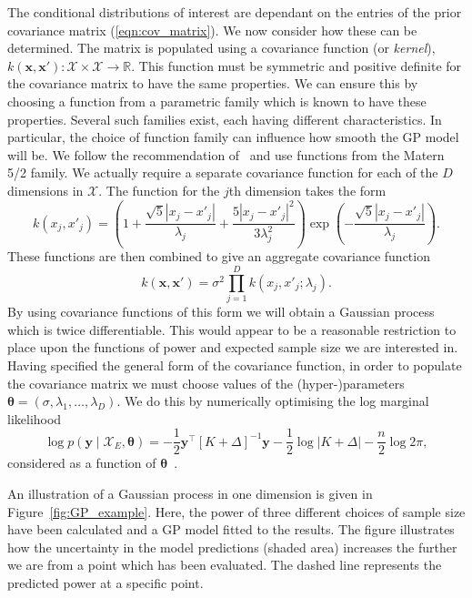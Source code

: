 \documentclass{article} %
\begin{document}
The conditional distributions of interest are dependant on the entries of the prior covariance matrix (\ref{eqn:cov_matrix}). We now consider how these can be determined. The matrix is populated using a covariance function (or \emph{kernel}), $k(\mathbf{x}, \mathbf{x}') : \mathcal{X} \times \mathcal{X} \rightarrow \mathbb{R}$. This function must be symmetric and positive definite for the covariance matrix to have the same properties. We can ensure this by choosing a function from a parametric family which is known to have these properties. Several such families exist, each having different characteristics. In particular, the choice of function family can influence how smooth the GP model will be. We follow the  recommendation of~\cite{Roustant2012} and use functions from the Matern 5/2 family. We actually require a separate covariance function for each of the $D$ dimensions in $\mathcal{X}$. The function for the $j$th dimension takes the form
\begin{equation}
k(x_{j}, x'_{j}) = \left( 1 + \frac{\sqrt{5}|x_{j}-x'_{j}|}{\lambda_{j}} + \frac{5|x_{j}-x'_{j}|^{2}}{3\lambda_{j}^{2}} \right) \exp \left( - \frac{\sqrt{5}|x_{j}-x'_{j}|}{\lambda_{j}} \right).
\end{equation}
These functions are then combined to give an aggregate covariance function
\begin{equation}
k(\mathbf{x}, \mathbf{x}') = \sigma^{2} \prod_{j=1}^{D} k(x_{j}, x'_{j}; \lambda_{j}).
\end{equation}
By using covariance functions of this form we will obtain a Gaussian process which is twice differentiable. This would appear to be a reasonable restriction to place upon the functions of power and expected sample size we are interested in. Having specified the general form of the covariance function, in order to populate the covariance matrix we must choose values of the (hyper-)parameters $\boldsymbol{\theta} = ( \sigma, \lambda_{1}, \ldots , \lambda_{D} )$. We do this by numerically optimising the log marginal likelihood
\begin{equation}\label{eqn:loglik}
\log{p(\mathbf{y} \mid \mathcal{X}_{E}, \boldsymbol{\theta})} = -\frac{1}{2}\mathbf{y}^\top[K + \Delta]^{-1}\mathbf{y} - \frac{1}{2} \log{|K + \Delta|} - \frac{n}{2} \log{2\pi},
\end{equation}
considered as a function of $\boldsymbol{\theta}$~\cite{Rasmussen2006}.

An illustration of a Gaussian process in one dimension is given in Figure~\ref{fig:GP_example}. Here, the power of three different choices of sample size have been calculated and a GP model fitted to the results. The figure illustrates how the uncertainty in the model predictions (shaded area) increases the further we are from a point which has been evaluated. The dashed line represents the predicted power at a specific point.
\end{document}
